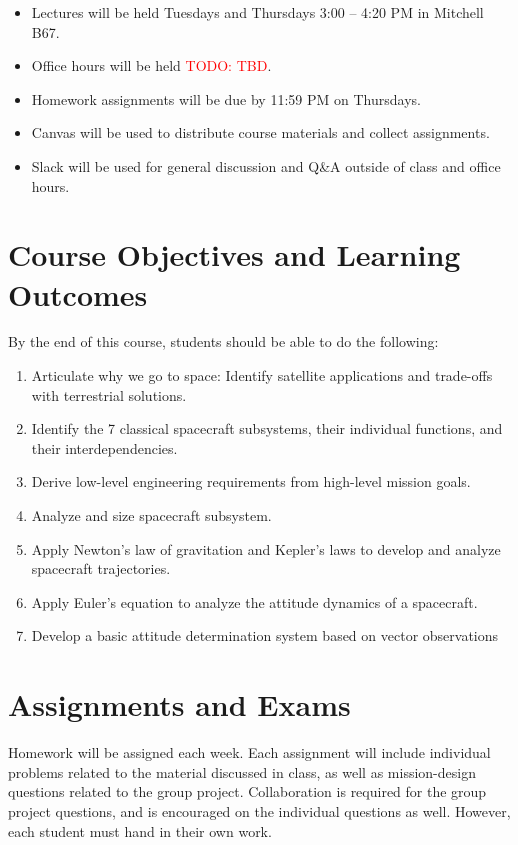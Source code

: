 \documentclass[11pt,letterpaper]{article}
\newcommand{\todo}[1]{\textcolor{red}{TODO: #1}}
\begin{document}
\begin{itemize}
	\item Lectures will be held Tuesdays and Thursdays 3:00 -- 4:20 PM in Mitchell B67.
	\item Office hours will be held \todo{TBD}.
	\item Homework assignments will be due by 11:59 PM on Thursdays.
	\item Canvas will be used to distribute course materials and collect assignments.
	\item Slack will be used for general discussion and Q\&A outside of class and office hours.
\end{itemize}

\section*{Course Objectives and Learning Outcomes}
By the end of this course, students should be able to do the following:
\begin{enumerate}
	\item Articulate why we go to space: Identify satellite applications and trade-offs with terrestrial solutions.
	\item Identify the 7 classical spacecraft subsystems, their individual functions, and their interdependencies.
	\item Derive low-level engineering requirements from high-level mission goals.
	\item Analyze and size spacecraft subsystem.
	\item Apply Newton's law of gravitation and Kepler's laws to develop and analyze spacecraft trajectories.
	\item Apply Euler's equation to analyze the attitude dynamics of a spacecraft.
	\item Develop a basic attitude determination system based on vector observations
	
\end{enumerate}

\section*{Assignments and Exams}

Homework will be assigned each week. Each assignment will include individual problems related to the material discussed in class, as well as mission-design questions related to the group project. Collaboration is required for the group project questions, and is encouraged on the individual questions as well. However, each student must hand in their own work.
\end{document}

